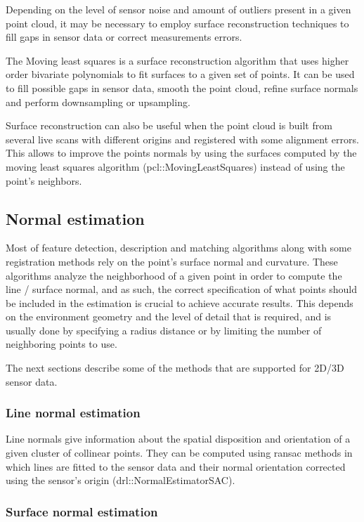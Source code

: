 Depending on the level of sensor noise and amount of outliers present in a given point cloud, it may be necessary to employ surface reconstruction techniques to fill gaps in sensor data or correct measurements errors.

The Moving least squares \cite{Alexa2003} is a surface reconstruction algorithm that uses higher order bivariate polynomials to fit surfaces to a given set of points. It can be used to fill possible gaps in sensor data, smooth the point cloud, refine surface normals and perform downsampling or upsampling.

Surface reconstruction can also be useful when the point cloud is built from several live scans with different origins and registered with some alignment errors. This allows to improve the points normals by using the surfaces computed by the moving least squares algorithm (pcl::MovingLeastSquares) instead of using the point's neighbors.


\subsection{Normal estimation}

Most of feature detection, description and matching algorithms along with some registration methods rely on the point's surface normal and curvature. These algorithms analyze the neighborhood of a given point in order to compute the line / surface normal, and as such, the correct specification of what points should be included in the estimation is crucial to achieve accurate results. This depends on the environment geometry and the level of detail that is required, and is usually done by specifying a radius distance or by limiting the number of neighboring points to use.

The next sections describe some of the methods that are supported for 2D/3D sensor data.


\subsubsection{Line normal estimation}

Line normals give information about the spatial disposition and orientation of a given cluster of collinear points. They can be computed using \gls{ransac} methods \cite{Fischler1981} in which lines are fitted to the sensor data and their normal orientation corrected using the sensor's origin (drl::NormalEstimatorSAC).


\subsubsection{Surface normal estimation}

